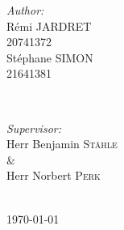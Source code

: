 \documentclass[a4paper,11pt,singlespacing]{article}
\begin{document}
\begin{titlepage}
	\begin{minipage}{0.4\textwidth}
		\begin{flushleft} \large
			\emph{Author:}\\
   			Rémi \textsc{JARDRET}\\
			20741372\\
			Stéphane \textsc{SIMON}\\
			21641381
		\end{flushleft}
	\end{minipage}
	~
	\begin{minipage}{0.4\textwidth}
		\begin{flushright} \large
			\emph{Supervisor:} \\
			Herr Benjamin \textsc{Stähle}\\ %
            \& \\
			Herr Norbert \textsc{Perk} %
		\end{flushright}
	\end{minipage}\\[5cm]
	
	
	
	{\large \today}\\[5cm] %
	

	
	\vfill %
	
\end{titlepage}


\tableofcontents
\pagebreak


\end{document}
